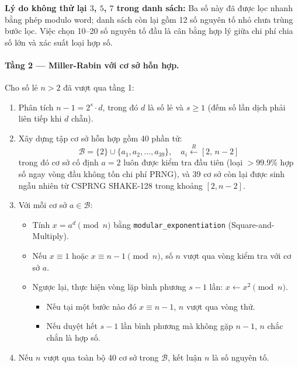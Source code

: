 \documentclass[12pt,a4paper]{article}
\theoremstyle{plain}
\begin{document}
\textbf{Lý do không thử lại $3$, $5$, $7$ trong danh sách:} Ba số này đã được lọc nhanh bằng phép modulo word; danh sách còn lại gồm 12 số nguyên tố nhỏ chưa trùng bước lọc. Việc chọn 10--20 số nguyên tố đầu là cân bằng hợp lý giữa chi phí chia số lớn và xác suất loại hợp số.

\paragraph{Tầng 2 — Miller-Rabin với cơ sở hỗn hợp.}
Cho số lẻ $n > 2$ đã vượt qua tầng 1:
\begin{enumerate}
    \item Phân tích $n - 1 = 2^s \cdot d$, trong đó $d$ là số lẻ và $s \ge 1$ (đếm số lần dịch phải liên tiếp khi $d$ chẵn).
    \item Xây dựng tập cơ sở hỗn hợp gồm 40 phần tử:
    \begin{equation}
    \mathcal{B} = \{2\} \cup \{a_1, a_2, \ldots, a_{39}\}, \quad a_i \xleftarrow{R} [2,\, n-2]
    \end{equation}
    trong đó cơ sở cố định $a = 2$ luôn được kiểm tra đầu tiên (loại $>99.9\%$ hợp số ngay vòng đầu không tốn chi phí PRNG), và 39 cơ sở còn lại được sinh ngẫu nhiên từ CSPRNG SHAKE-128 trong khoảng $[2, n-2]$.
    \item Với mỗi cơ sở $a \in \mathcal{B}$:
    \begin{itemize}
        \item Tính $x = a^d \pmod n$ bằng \texttt{modular\_exponentiation} (Square-and-Multiply).
        \item Nếu $x \equiv 1$ hoặc $x \equiv n - 1 \pmod n$, số $n$ vượt qua vòng kiểm tra với cơ sở $a$.
        \item Ngược lại, thực hiện vòng lặp bình phương $s - 1$ lần: $x \leftarrow x^2 \pmod n$.
        \begin{itemize}
            \item Nếu tại một bước nào đó $x \equiv n - 1$, $n$ vượt qua vòng thử.
            \item Nếu duyệt hết $s - 1$ lần bình phương mà không gặp $n - 1$, $n$ chắc chắn là hợp số.
        \end{itemize}
    \end{itemize}
    \item Nếu $n$ vượt qua toàn bộ 40 cơ sở trong $\mathcal{B}$, kết luận $n$ là số nguyên tố.
\end{enumerate}
\end{document}
